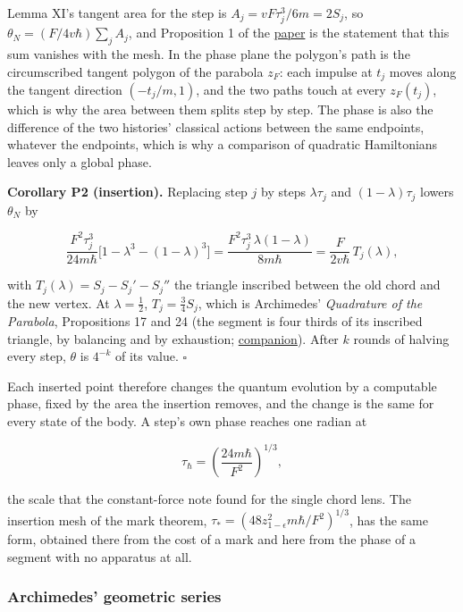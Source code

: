 \documentclass[11pt,a4paper]{article}
\begin{document}
Lemma XI's tangent area for the step is \(A_j=vF\tau_j^3/6m=2S_j\), so
\(\theta_N=(F/4v\hbar)\sum_jA_j\), and Proposition 1 of the
\href{planck-gap-paper.md}{paper} is the statement that this sum
vanishes with the mesh. In the phase plane the polygon's path is the
circumscribed tangent polygon of the parabola \(z_F\): each impulse at
\(t_j\) moves along the tangent direction \((-t_j/m,1)\), and the two
paths touch at every \(z_F(t_j)\), which is why the area between them
splits step by step. The phase is also the difference of the two
histories' classical actions between the same endpoints, whatever the
endpoints, which is why a comparison of quadratic Hamiltonians leaves
only a global phase.

\textbf{Corollary P2 (insertion).} Replacing step \(j\) by steps
\(\lambda\tau_j\) and \((1-\lambda)\tau_j\) lowers \(\theta_N\) by

\[\frac{F^2\tau_j^3}{24m\hbar}\bigl[1-\lambda^3-(1-\lambda)^3\bigr]
=\frac{F^2\tau_j^3\,\lambda(1-\lambda)}{8m\hbar}
=\frac{F}{2v\hbar}\,T_j(\lambda),\]

with \(T_j(\lambda)=S_j-S_j'-S_j''\) the triangle inscribed between the
old chord and the new vertex. At \(\lambda=\frac12\),
\(T_j=\frac34S_j\), which is Archimedes' \emph{Quadrature of the
Parabola}, Propositions 17 and 24 (the segment is four thirds of its
inscribed triangle, by balancing and by exhaustion;
\href{../docs/classics/Archimedes_QuadratureParabola_Heath1897_OCR.md}{companion}).
After \(k\) rounds of halving every step, \(\theta\) is \(4^{-k}\) of
its value. \(\square\)

Each inserted point therefore changes the quantum evolution by a
computable phase, fixed by the area the insertion removes, and the
change is the same for every state of the body. A step's own phase
reaches one radian at

\[\tau_\hbar=\left(\frac{24m\hbar}{F^2}\right)^{1/3},\]

the scale that the constant-force note found for the single chord lens.
The insertion mesh of the mark theorem,
\(\tau_*=(48z_{1-\epsilon}^2m\hbar/F^2)^{1/3}\), has the same form,
obtained there from the cost of a mark and here from the phase of a
segment with no apparatus at all.

\hypertarget{archimedes-geometric-series}{%
\subsubsection{Archimedes' geometric
series}\label{archimedes-geometric-series}}
\end{document}
